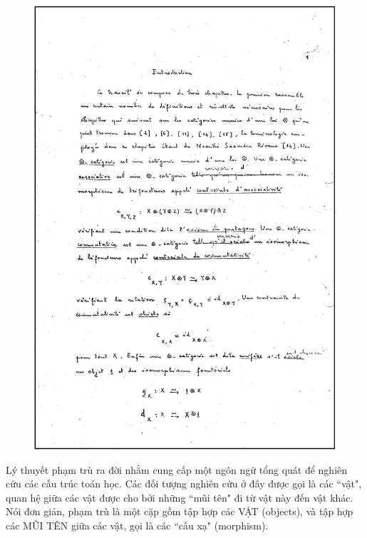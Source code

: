 \begin{multicols}{2}
\begin{figure}[H]
		\includegraphics[height= 0.72\linewidth]{Anh22}
		\vspace*{-10pt}
	\end{figure}
	Lý thuyết phạm trù ra đời nhằm cung cấp một ngôn ngữ tổng quát để nghiên cứu các cấu trúc toán học. Các đối tượng nghiên cứu ở đây được gọi là các ``vật", quan hệ giữa các vật được cho bởi những ``mũi tên" đi từ vật này đến vật khác. Nói đơn giản, phạm trù là một cặp gồm tập hợp các VẬT (objects), và tập hợp các MŨI TÊN giữa các  vật, gọi là các ``cấu xạ" (morphism).
	\vskip 0.1cm
	

\end{multicols}
